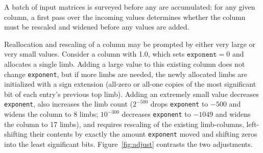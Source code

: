 \documentclass[acmsmall,screen,review]{acmart}
\newcommand{\code}[1]{\texttt{#1}}
\begin{document}
A batch of input matrices is surveyed before any are accumulated: for any given column, a first pass over the incoming values determines whether the column must be rescaled and widened before any values are added.

Reallocation and rescaling of a column may be prompted by either very large or very small values. Consider a column with 1.0, which sets $\code{exponent} = 0$ and allocates a single limb. Adding a large value to this existing column does not change \code{exponent}, but if more limbs are needed, the newly allocated limbs are initialized with a sign extension (all-zero or all-one copies of the most significant bit of each entry's previous top limb). Adding an extremely small value decreases \code{exponent}, also increases the limb count ($2^{-500}$ drops \code{exponent} to $-500$ and widens the column to 8 limbs; $10^{-300}$ decreases \code{exponent} to $-1049$ and widens the column to 17 limbs), and requires rescaling of the existing limb-columns, left-shifting their contents by exactly the amount \code{exponent} moved and shifting zeros into the least significant bits. Figure~\ref{fig:adjust} contrasts the two adjustments.
\end{document}
